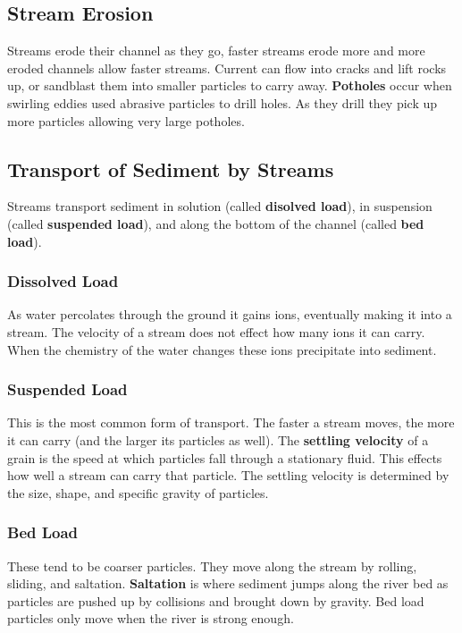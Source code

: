 \documentclass{article}
\begin{document}
\subsection{Stream Erosion} %
\label{sub:stream_erosion}
Streams erode their channel as they go, faster streams erode more and more eroded channels allow faster streams. Current can flow into cracks and lift rocks up, or sandblast them into smaller particles to carry away. \textbf{Potholes} occur when swirling eddies used abrasive particles to drill holes. As they drill they pick up more particles allowing very large potholes.

\subsection{Transport of Sediment by Streams} %
\label{sub:transport_of_sediment_by_streams}
Streams transport sediment in solution (called \textbf{disolved load}), in suspension (called \textbf{suspended load}), and along the bottom of the channel (called \textbf{bed load}).
\subsubsection{Dissolved Load} %
\label{ssub:dissolved_load}
As water percolates through the ground it gains ions, eventually making it into a stream. The velocity of a stream does not effect how many ions it can carry. When the chemistry of the water changes these ions precipitate into sediment.
\subsubsection{Suspended Load} %
\label{ssub:suspended_load}
This is the most common form of transport. The faster a stream moves, the more it can carry (and the larger its particles as well). The \textbf{settling velocity} of a grain is the speed at which particles fall through a stationary fluid. This effects how well a stream can carry that particle. The settling velocity is determined by the size, shape, and specific gravity of particles.

\subsubsection{Bed Load} %
\label{ssub:bed_load}
These tend to be coarser particles. They move along the stream by rolling, sliding, and saltation. \textbf{Saltation} is where sediment jumps along the river bed as particles are pushed up by collisions and brought down by gravity. Bed load particles only move when the river is strong enough.
\end{document}
